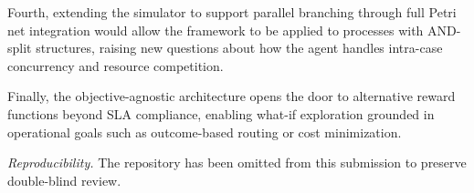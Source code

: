 \documentclass[runningheads]{llncs}
\begin{document}
Fourth, extending the simulator to support parallel branching through 
full Petri net integration would allow the framework to be applied to 
processes with AND-split structures, raising new questions about how 
the agent handles intra-case concurrency and resource competition.

Finally, the objective-agnostic architecture opens the door to 
alternative reward functions beyond SLA compliance, enabling what-if 
exploration grounded in operational goals such as outcome-based 
routing or cost minimization.

\bigskip
\noindent\textit{Reproducibility.} The repository 
has been omitted from this submission to preserve double-blind review.

%
% 


 
\end{document}
